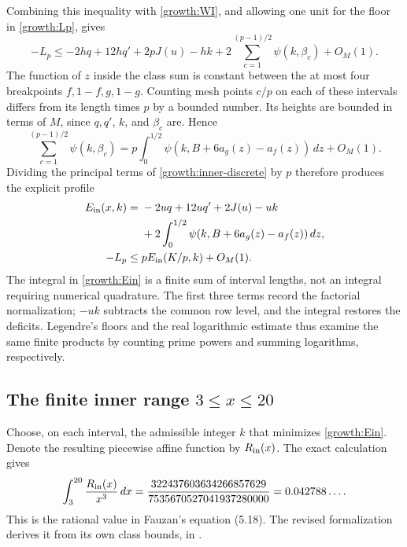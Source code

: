 Combining this inequality with \eqref{growth:WI}, and allowing one unit
for the floor in \eqref{growth:Lp}, gives
\begin{equation}\label{growth:inner-discrete}
 -L_p\le -2hq+12hq'+2pJ(u)-hk
       +2\sum_{c=1}^{(p-1)/2}\psi(k,\beta_c)+O_M(1).
\end{equation}
The function of \(z\) inside the class sum is constant between the at
most four breakpoints \(f,1-f,g,1-g\). Counting mesh points \(c/p\)
on each of these intervals differs from its length times \(p\)
by a bounded number. Its heights are bounded in terms of \(M\), since
\(q,q'\), \(k\), and \(\beta_c\) are. Hence
\[
 \sum_{c=1}^{(p-1)/2}\psi(k,\beta_c)
 =
 p\int_0^{1/2}\psi(k,B+6a_g(z)-a_f(z))\,dz+O_M(1).
\]
Dividing the principal terms of \eqref{growth:inner-discrete} by \(p\)
therefore produces the explicit profile
\begin{align}
 E_{\rm in}(x,k)
 ={}&-2uq+12uq'+2J(u)-uk \notag\\
 &+2\int_0^{1/2}\psi(k,B+6a_g(z)-a_f(z))\,dz,
 \label{growth:Ein}\\
 -L_p\le{}&pE_{\rm in}(K/p,k)+O_M(1).
 \label{growth:inner-profile-bound}
\end{align}
The integral in \eqref{growth:Ein} is a finite sum of interval lengths,
not an integral requiring numerical quadrature.
The first three terms record the factorial normalization; \(-uk\)
subtracts the common row level, and the integral restores the deficits.
Legendre's floors and the real logarithmic estimate thus examine the
same finite products by counting prime powers and summing logarithms,
respectively.

\subsection{The finite inner range \texorpdfstring{\(3\le x\le20\)}{3 <= x <= 20}}

Choose, on each interval, the admissible integer \(k\) that minimizes
\eqref{growth:Ein}. Denote the resulting piecewise affine function by
\(R_{\rm in}(x)\). The exact calculation gives
\begin{equation}\label{growth:inner-integral}
 \int_3^{20}\frac{R_{\rm in}(x)}{x^3}\,dx
 =\frac{322437603634266857629}{7535670527041937280000}
 =0.042788\ldots.
\end{equation}
This is the rational value in Fauzan's equation (5.18). The revised
formalization derives it from its own class bounds, in
\cite[\texttt{Growth/InnerTable.lean}, \texttt{InnerSum.lean}]{firsching}.

